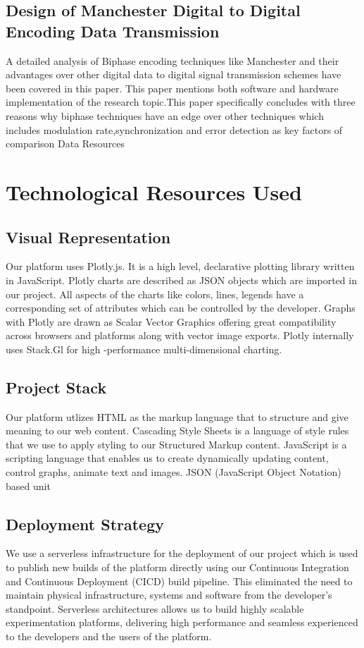 \documentclass[10pt,journal,compsoc]{IEEEtran}
\begin{document}
\subsection{Design of Manchester Digital to Digital Encoding Data Transmission}
A detailed analysis of Biphase encoding techniques like Manchester and their advantages over other digital data to digital signal transmission schemes have been covered in this paper. This paper mentions both software and hardware implementation of the research topic.This paper specifically concludes with three reasons why biphase techniques have an edge over other techniques which includes modulation rate,synchronization and error detection as key factors of comparison
Data Resources

\section{Technological Resources Used}

\subsection{Visual Representation}
Our platform uses Plotly.js. It is a high level, declarative plotting library written in JavaScript. Plotly charts are described as JSON objects which are imported in our project. All aspects of the charts like colors, lines, legends have a corresponding set of attributes which can be controlled by the developer. Graphs with Plotly are drawn as Scalar Vector Graphics offering great compatibility across browsers and platforms along with vector image exports. Plotly internally uses Stack.Gl for high -performance multi-dimensional charting.

\subsection{Project Stack}
Our platform utlizes HTML as the markup language that to structure and give meaning to our web content.
Cascading Style Sheets is a language of style rules that we use to apply styling to our Structured Markup content.
JavaScript is a scripting language that enables us to create dynamically updating content, control graphs, animate text and images.
JSON (JavaScript Object Notation) based unit

\subsection{Deployment Strategy}
We use a serverless infrastructure for the deployment of our project which is used to publish new builds of the platform directly using our Continuous Integration and Continuous Deployment (CICD) build pipeline. This eliminated the need to maintain physical infrastructure, systems and software from the developer's standpoint. Serverless architectures allows us to build  highly scalable experimentation platforms, delivering high performance and seamless experienced to the developers and the users of the platform.
\end{document}
